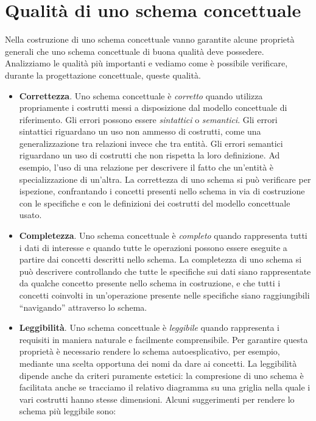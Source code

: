 \documentclass[12pt]{report}
\begin{document}
 	\section{Qualità di uno schema concettuale}
 	Nella costruzione di uno schema concettuale vanno garantite alcune proprietà generali che uno schema concettuale di buona qualità deve possedere. Analizziamo le qualità più importanti e vediamo come è possibile verificare, durante la progettazione concettuale, queste qualità.
 	\begin{itemize}
 		\item \textbf{Correttezza}. Uno schema concettuale è \textit{corretto} quando utilizza propriamente i costrutti messi a disposizione dal modello concettuale di riferimento. Gli errori possono essere \textit{sintattici} o \textit{semantici}. Gli errori sintattici riguardano un uso non ammesso di costrutti, come una generalizzazione tra relazioni invece che tra entità. Gli errori semantici riguardano un uso di costrutti che non rispetta la loro definizione. Ad esempio, l'uso di una relazione per descrivere il fatto che un'entità è specializzazione di un'altra. La correttezza di uno schema si può verificare per ispezione, confrantando i concetti presenti nello schema in via di costruzione con le specifiche e con le definizioni dei costrutti del modello concettuale usato.
 		\item \textbf{Completezza}. Uno schema concettuale è \textit{completo} quando rappresenta tutti i dati di interesse e quando tutte le operazioni possono essere eseguite a partire dai concetti descritti nello schema. La completezza di uno schema si può descrivere controllando che tutte le specifiche sui dati siano rappresentate da qualche concetto presente nello schema in costruzione, e che tutti i concetti coinvolti in un'operazione presente nelle specifiche siano raggiungibili ``navigando'' attraverso lo schema.
 		\item \textbf{Leggibilità}. Uno schema concettuale è \textit{leggibile} quando rappresenta i requisiti in maniera naturale e facilmente comprensibile. Per garantire questa proprietà è necessario rendere lo schema autoesplicativo, per esempio, mediante una scelta opportuna dei nomi da dare ai concetti. La leggibilità dipende anche da criteri puramente estetici: la compresione di uno schema è facilitata anche se tracciamo il relativo diagramma su una griglia nella quale i vari costrutti hanno stesse dimensioni. Alcuni suggerimenti per rendere lo schema più leggibile sono:
 		\begin{itemize}

\end{itemize}
\end{itemize}
\end{document}
